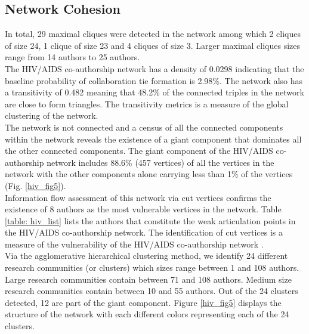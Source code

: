 \subsection{Network Cohesion}
In total, 29 maximal cliques were detected in the network among which 2 cliques of size 24, 1 clique of size 23 and 4 cliques of size 3. Larger maximal cliques sizes range from 14 authors to 25 authors. \\The HIV/AIDS co-authorship network has a density of 0.0298 indicating that the baseline probability of collaboration tie formation is 2.98\%. The network also has a transitivity of 0.482 meaning that 48.2\% of the connected triples in the network are close to form triangles. The transitivity metrics is a measure of the global clustering of the network.\\The network is not connected and a census of all the connected components within the network reveals the existence of a giant component that dominates all the other connected components. The giant component of the HIV/AIDS co-authorship network includes 88.6\% (457 vertices) of all the vertices in the network with the other components alone carrying less than 1\% of the vertices (Fig. \ref{hiv_fig5}). \\
Information flow assessment of this network via cut vertices confirms the existence of 8 authors as the most vulnerable vertices in the network. Table \ref{table: hiv_list} lists the authors that constitute the weak articulation points in the HIV/AIDS co-authorship network. The identification of cut vertices is a measure of the vulnerability of the HIV/AIDS co-authorship network \cite{kolaczyk_statistical_2014}.\\
Via the agglomerative hierarchical clustering method, we identify 24 different research communities (or clusters) which sizes range between 1 and 108 authors. Large research communities contain between 71 and 108 authors. Medium size research communities contain between 10 and 55 authors. Out of the 24 clusters detected, 12 are part of the giant component. Figure \ref{hiv_fig5} displays the structure of the network with each different colors representing each of the 24 clusters.

